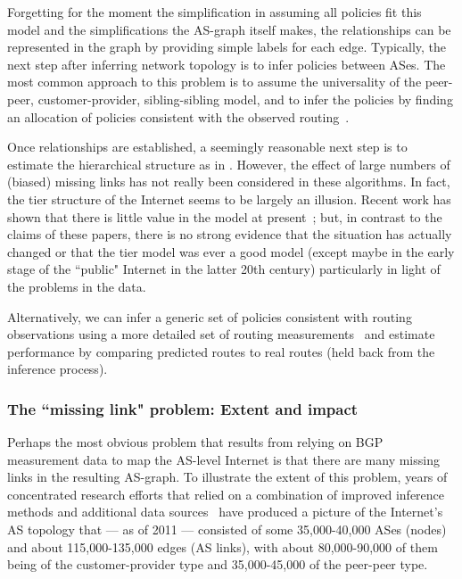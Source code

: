 Forgetting for the moment the simplification in assuming all policies fit this 
model and the simplifications the AS-graph itself makes, the relationships can 
be represented in the graph by providing simple labels for each edge. Typically, 
the next step after inferring network topology is to infer policies between ASes. 
The most common approach to this problem is to assume the universality of the peer-peer, 
customer-provider, sibling-sibling model, and to infer the policies by finding an 
allocation of policies consistent with the observed
routing~\cite{gao_inferring,xia04:_as,wang03:_infer,battista_inferring:2003,dimitropoulos07:_as_relat}. 

Once relationships are established, a seemingly reasonable next step
is to estimate the hierarchical structure as in
\cite{subramanian02:_charac_inter}. However, the effect of large
numbers of (biased) missing links has not really been considered in
these algorithms.  In fact, the tier structure of the Internet seems
to be largely an illusion. Recent work has shown that there is little
value in the model at
present~\cite{gill08:_flatt_inter_topol,labovitz10:_inter_inter_domain_traff};
but, in contrast to the claims of these papers, there is no strong
evidence that the situation has actually changed or that the tier
model was ever a good model (except maybe in the early stage of the
``public" Internet in the latter 20th century) particularly in light
of the problems in the data.

Alternatively, we can infer a generic set of policies consistent with
routing observations using a more detailed set of routing
measurements~\cite{path_inference_sigmetrics:2005,muehlbauer06:_build_as}
and estimate performance by comparing predicted routes to real routes
(held back from the inference process).


\subsubsection{The ``missing link" problem: Extent and impact}

Perhaps the most obvious problem that results from relying on BGP measurement 
data to map the AS-level Internet is that there are many missing links in the 
resulting AS-graph.  To illustrate the extent of this problem, years of 
concentrated research efforts that relied on a combination of improved inference methods and additional data sources~\cite{chang04:_towards,zhang05:_collec_inter_as_topol,muehlbauer06:_build_as,dimitropoulos07:_as_relat,he07,he09:_lord_of_links,roughan08:_bigfoot,augustin09:_ixps,chen09:_sidewalk,oliveira10:_incompl_of_obser_inter,dhamdhere11:_twelv_years_evolut_inter_ecosy,sanchez13:_dasu}
have produced a picture of the Internet's AS topology that --- as of 
2011 --- consisted of some 35,000-40,000 ASes (nodes) and about 115,000-135,000 
edges (AS links), with about 80,000-90,000 of them being of the customer-provider type and 
35,000-45,000 of the peer-peer type.

